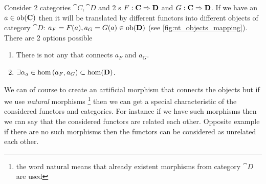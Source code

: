 Consider 2 categories $\cat{C}, \cat{D}$ and 2
s $F: \mathbf{C} \Rightarrow \mathbf{D}$ and $G:
\mathbf{C} \Rightarrow \mathbf{D}$. If we have an  $a \in \mathrm{ob}(\mathbf{C})$ then
it will be translated by different functors into different objects of
category $\cat{D}$: $a_F = F(a), a_G = G(a) \in \mathrm{ob}(\mathbf{D})$ (see
\cref{fig:nt_objects_mapping}). There are 2 options possible
\begin{enumerate}
\item There is not  any  that connects $a_F$
  and $a_G$.
\item $\exists \alpha_a \in \catmset{a_F}{a_G} \subset
  \cathom{D}$. 
\end{enumerate}
We can of course to create an artificial morphism that connects the
objects but if we use \textit{natural} morphisms 
\footnote{the word natural means that already existent morphisms from
  category $\cat{D}$ are used}
then we can get a
special characteristic of the considered functors and categories. For
instance if we have such morphisms then we can say that the
considered functors are related each other. Opposite example if there
are no such morphisms then the functors can be considered as unrelated
each other. 

